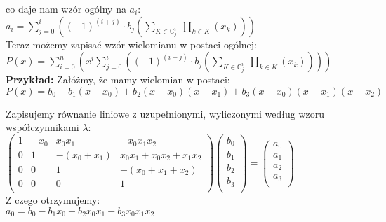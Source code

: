 \documentclass[a4paper,12pt]{article}
\newcommand{\id}{\noindent}
\newcommand{\bl}[1]{\textbf{#1}}
\begin{document}
\id
co daje nam wzór ogólny na $a_i$: \\

$a_i = \sum\limits_{j=0}^{i} \left( (-1)^{(i+j)}\cdot b_j\left( \sum\limits_{K \in \mathbb{C}_j^i} \ \prod\limits_{k \in K} \left( x_k \right) \right) \right)$ \\

\id
Teraz możemy zapisać wzór wielomianu w postaci ogólnej: \\

$P(x) = \sum\limits_{i=0}^{n} \left( x^i\sum\limits_{j=0}^{i} \left( (-1)^{(i+j)}\cdot b_j\left( \sum\limits_{K \in \mathbb{C}_j^i} \ \prod\limits_{k \in K} \left( x_k \right) \right) \right) \right)$ \\

\id
\bl{Przykład:} Załóżmy, że mamy wielomian w postaci: \\

$P(x) = b_0 + b_1(x-x_0) + b_2(x-x_0)(x-x_1) + b_3(x-x_0)(x-x_1)(x-x_2)$ \\

\newpage

\id
Zapisujemy równanie liniowe z uzupełnionymi, wyliczonymi według wzoru współczynnikami $\lambda$: \\

$
\begin{pmatrix}
1 & -x_0 & x_0x_1 & -x_0x_1x_2\\
0 & 1 & -(x_0+x_1) & x_0x_1 + x_0x_2 + x_1x_2 \\
0 & 0 & 1 & -(x_0+x_1+x_2)\\
0 & 0 & 0 & 1 \\
\end{pmatrix}
\begin{pmatrix}
b_0 \\
b_1 \\
b_2 \\
b_3 \\
\end{pmatrix}
=
\begin{pmatrix}
a_0 \\
a_1 \\
a_2 \\
a_3 \\
\end{pmatrix}
$ \\

\id
Z czego otrzymujemy: \\

$a_0 = b_0 - b_1x_0 + b_2x_0x_1 - b_3x_0x_1x_2$ \\
\end{document}
